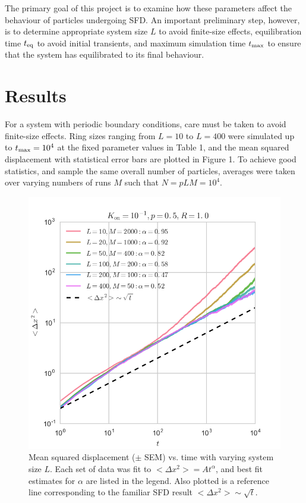 \documentclass[12pt]{article}
\begin{document}
The primary goal of this project is to examine how these parameters affect the behaviour of particles undergoing SFD.
An important preliminary step, however, is to determine appropriate system size $L$ to avoid finite-size effects, equilibration time $t_{\rm eq}$ to avoid initial transients, and maximum simulation time $t_{\rm max}$ to ensure that the system has equilibrated to its final behaviour.

\newpage

\section{Results}

For a system with periodic boundary conditions, care must be taken to avoid finite-size effects.
Ring sizes ranging from $L = 10$ to $L = 400$ were simulated up to $t_{\rm max} = 10^4$ at the fixed parameter values in Table 1, and the mean squared displacement with statistical error bars are plotted in Figure 1.
To achieve good statistics, and sample the same overall number of particles, averages were taken over varying numbers of runs $M$ such that $N = pLM = 10^4$.

\begin{figure}[h]
    \centering
    \includegraphics[width=0.8\linewidth]{../plots/L_dependence.png}
    \caption{Mean squared displacement ($\pm$ SEM) vs. time with varying system size $L$. Each set of data was fit to $<\Delta x^2> = A t^{\alpha}$, and best fit estimates for $\alpha$ are listed in the legend. Also plotted is a reference line corresponding to the familiar SFD result $<\Delta x^2> \sim \sqrt{t}$.}
\end{figure}
\end{document}
